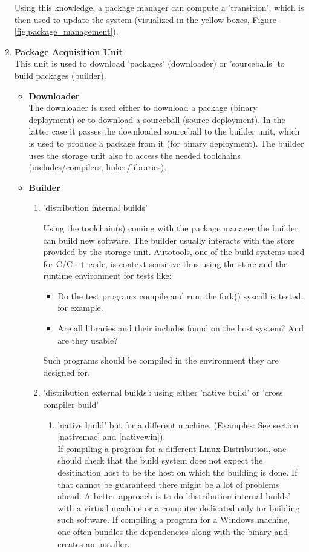 \documentclass[a4paper,10pt]{article}
\begin{document}
\begin{enumerate}
Using this knowledge, a package manager can compute a 'transition', which is then used to update the system (visualized in the yellow boxes, Figure \ref{fig:package_management}).



\item \textbf{Package Acquisition Unit}\\
This unit is used to download 'packages' (downloader) or 'sourceballs' to build packages (builder).


\begin{itemize}
\item \textbf{Downloader} \\
The downloader is used either to download a package (binary deployment) or to download a sourceball (source deployment). In the latter case it passes the downloaded sourceball to the builder unit, which is used to produce a package from it (for binary deployment). The builder uses the storage unit also to access the needed toolchains (includes/compilers, linker/libraries).

\item \textbf{Builder}
\begin{enumerate}
\item 'distribution internal builds'

Using the toolchain(s) coming with the package manager the builder can build new software. The builder usually interacts with the store provided by the storage unit. Autotools, one of the build systems used for C/C++ code, is context sensitive thus using the store and the runtime environment for tests like: 
\begin{itemize}
 \item Do the test programs compile and run: the fork() syscall is tested, for example.
 \item Are all libraries and their includes found on the host system? And are they usable?
\end{itemize}
Such programs should be compiled in the environment they are designed for.
 

\item 'distribution external builds': using either 'native build' or 'cross compiler build'

\begin{enumerate}
 \item 'native build' but for a different machine. (Examples: See section \ref{nativemac} and \ref{nativewin}).\\
If compiling a program for a different Linux Distribution, one should check that the build system does not expect the desitination host to be the host on which the building is done. If that cannot be guaranteed there might be a lot of problems ahead. A better approach is to do 'distribution internal builds' with a virtual machine or a computer dedicated only for building such software. If compiling a program for a Windows machine, one often bundles the dependencies along with the binary and creates an installer. 


\end{enumerate}
\end{enumerate}
\end{itemize}
\end{enumerate}
\end{document}
